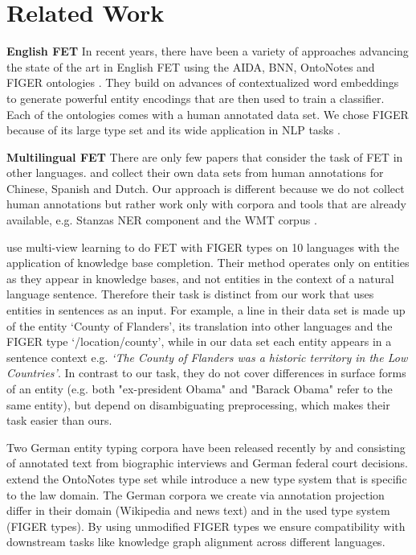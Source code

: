 \documentclass[11pt,a4paper]{article}
\begin{document}
\section{Related Work}
\textbf{English FET} In recent years, there have been a variety of approaches advancing the state of the art in English FET using the AIDA, BNN, OntoNotes and FIGER ontologies \citep{ChenCD20, dai2019improving, lopez-etal-2019-fine}. They build on advances of contextualized word embeddings \citep{Peters:2018, conneau2019unsupervised} to generate powerful entity encodings that are then used to train a classifier. Each of the ontologies comes with a human annotated data set. We chose FIGER because of its large type set and its wide application in NLP tasks \citep{hosseini2018learning}.

\textbf{Multilingual FET} There are only few papers that consider the task of FET in other languages. \citet{lee2020chinese} and \citet{van2017multilingual} collect their own data sets from human annotations for Chinese, Spanish and Dutch. Our approach is different because we do not collect human annotations but rather work only with corpora and tools that are already available, e.g. Stanzas NER component \citet{qi2020stanza} and the WMT corpus \citep{barrault2019findings}.

\citet{yaghoobzadeh2018multi} use multi-view learning to do FET with FIGER types on 10 languages with the application of knowledge base completion. Their method operates only on entities as they appear in knowledge bases, and not entities in the context of a natural language sentence. Therefore their task is distinct from our work that uses entities in sentences as an input. For example, a line in their data set is made up of the entity `County of Flanders', its translation into other languages and the FIGER type `/location/county', while in our data set each entity appears in a sentence context e.g. \textit{`The County of Flanders was a historic territory in the Low Countries'}. In contrast to our task, they do not cover differences in surface forms of an entity (e.g. both "ex-president Obama" and "Barack Obama" refer to the same entity), but depend on disambiguating preprocessing, which makes their task easier than ours.

Two German entity typing corpora have been released recently by \citet{ruppenhofer2020fine} and \citet{leitnerdataset} consisting of annotated text from biographic interviews and German federal court decisions. \citet{ruppenhofer2020fine} extend the OntoNotes type set while \citet{leitnerdataset} introduce a new type system that is specific to the law domain. The German corpora we create via annotation projection differ in their domain (Wikipedia and news text) and in the used type system (FIGER types). By using unmodified FIGER types we ensure compatibility with downstream tasks like knowledge graph alignment across different languages.
\end{document}

